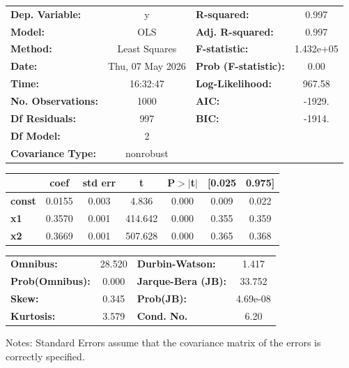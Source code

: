 \begin{center}
\begin{tabular}{lclc}
\toprule
\textbf{Dep. Variable:}    &        y         & \textbf{  R-squared:         } &     0.997   \\
\textbf{Model:}            &       OLS        & \textbf{  Adj. R-squared:    } &     0.997   \\
\textbf{Method:}           &  Least Squares   & \textbf{  F-statistic:       } & 1.432e+05   \\
\textbf{Date:}             & Thu, 07 May 2026 & \textbf{  Prob (F-statistic):} &     0.00    \\
\textbf{Time:}             &     16:32:47     & \textbf{  Log-Likelihood:    } &    967.58   \\
\textbf{No. Observations:} &        1000      & \textbf{  AIC:               } &    -1929.   \\
\textbf{Df Residuals:}     &         997      & \textbf{  BIC:               } &    -1914.   \\
\textbf{Df Model:}         &           2      & \textbf{                     } &             \\
\textbf{Covariance Type:}  &    nonrobust     & \textbf{                     } &             \\
\bottomrule
\end{tabular}
\begin{tabular}{lcccccc}
               & \textbf{coef} & \textbf{std err} & \textbf{t} & \textbf{P$> |$t$|$} & \textbf{[0.025} & \textbf{0.975]}  \\
\midrule
\textbf{const} &       0.0155  &        0.003     &     4.836  &         0.000        &        0.009    &        0.022     \\
\textbf{x1}    &       0.3570  &        0.001     &   414.642  &         0.000        &        0.355    &        0.359     \\
\textbf{x2}    &       0.3669  &        0.001     &   507.628  &         0.000        &        0.365    &        0.368     \\
\bottomrule
\end{tabular}
\begin{tabular}{lclc}
\textbf{Omnibus:}       & 28.520 & \textbf{  Durbin-Watson:     } &    1.417  \\
\textbf{Prob(Omnibus):} &  0.000 & \textbf{  Jarque-Bera (JB):  } &   33.752  \\
\textbf{Skew:}          &  0.345 & \textbf{  Prob(JB):          } & 4.69e-08  \\
\textbf{Kurtosis:}      &  3.579 & \textbf{  Cond. No.          } &     6.20  \\
\bottomrule
\end{tabular}
\end{center}

Notes: \newline
 [1] Standard Errors assume that the covariance matrix of the errors is correctly specified.